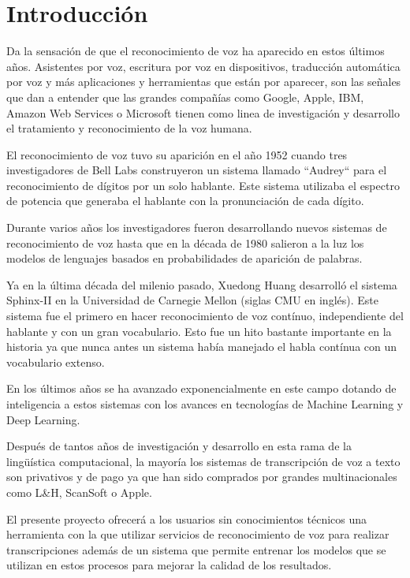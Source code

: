 \documentclass[../main.tex]{subfiles}
\begin{document}
\chapter{Introducción}\label{ch:introduccion}
Da la sensación de que el reconocimiento de voz ha aparecido en estos últimos años. Asistentes por voz, escritura por voz en dispositivos, traducción automática por voz y más aplicaciones y herramientas que están por aparecer, son las señales que dan a entender que las grandes compañías como Google, Apple, IBM, Amazon Web Services o Microsoft tienen como linea de investigación y desarrollo el tratamiento y reconocimiento de la voz humana.

El reconocimiento de voz tuvo su aparición en el año 1952 cuando tres investigadores de Bell Labs construyeron un sistema llamado ``Audrey`` para el reconocimiento de dígitos por un solo hablante. Este sistema utilizaba el espectro de potencia que generaba el hablante con la pronunciación de cada dígito.

Durante varios años los investigadores fueron desarrollando nuevos sistemas de reconocimiento de voz hasta que en la década de 1980 salieron a la luz los modelos de lenguajes basados en probabilidades de aparición de palabras.

Ya en la última década del milenio pasado, Xuedong Huang desarrolló el sistema Sphinx-II en la Universidad de Carnegie Mellon (siglas CMU en inglés). Este sistema fue el primero en hacer reconocimiento de voz contínuo, independiente del hablante y con un gran vocabulario. Esto fue un hito bastante importante en la historia ya que nunca antes un sistema había manejado el habla contínua con un vocabulario extenso.

En los últimos años se ha avanzado exponencialmente en este campo dotando de inteligencia a estos sistemas con los avances en tecnologías de Machine Learning y Deep Learning. 

Después de tantos años de investigación y desarrollo en esta rama de la lingüística computacional, la mayoría los sistemas de transcripción de voz a texto son privativos y de pago ya que han sido comprados por grandes multinacionales como L\&H, ScanSoft o Apple.

El presente proyecto ofrecerá a los usuarios sin conocimientos técnicos una herramienta con la que utilizar servicios de reconocimiento de voz para realizar transcripciones además de un sistema que permite entrenar los modelos que se utilizan en estos procesos para mejorar la calidad de los resultados. 
\end{document}
